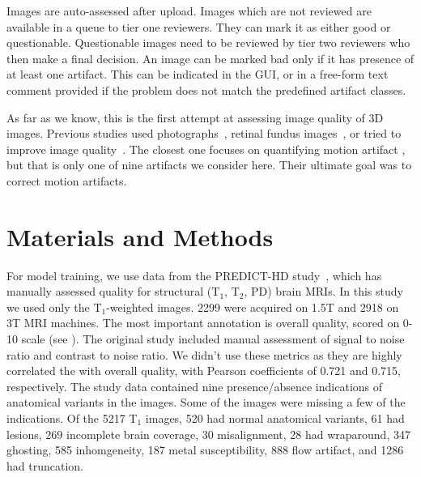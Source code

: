 \documentclass{midl} %
\begin{document}
Images are auto-assessed after upload.
Images which are not reviewed are available in a queue to tier one reviewers. They can mark it as either good or questionable. Questionable images need to be reviewed by tier two reviewers who then make a final decision. An image can be marked bad only if it has presence of at least one artifact. This can be indicated in the GUI, or in a free-form text comment provided if the problem does not match the predefined artifact classes.


As far as we know, this is the first attempt at assessing image quality of 3D images. Previous studies used photographs~\cite{bosse2017deep,hosu2020koniq}, retinal fundus images~\cite{yu2017image},
or tried to improve image quality~\cite{higaki2019improvement}. The closest one focuses on quantifying motion artifact \cite{butskova2021adversarial}, but that is only one of nine artifacts we consider here. Their ultimate goal was to correct motion artifacts. %

\section{Materials and Methods}

For model training, we use data from the PREDICT-HD study~\cite{paulsen2014clinical}, which has manually assessed quality for structural (T$_1$, T$_2$, PD) brain MRIs. In this study we used only the T$_1$-weighted images. 2299 were acquired on 1.5T and 2918 on 3T MRI machines. The most important annotation is overall quality, scored on 0-10 scale (see ). The original study included manual assessment of signal to noise ratio and contrast to noise ratio. We didn't use these metrics as they are highly correlated the with overall quality, with Pearson coefficients of 0.721 and 0.715, respectively.
The study data contained nine presence/absence indications of anatomical variants in the images. Some of the images were missing a few of the indications. Of the 5217 T$_1$ images, 520 had normal anatomical variants, 61 had lesions, 269 incomplete brain coverage, 30 misalignment, 28 had wraparound, 347 ghosting, 585 inhomgeneity, 187 metal susceptibility, 888 flow artifact, and 1286 had truncation.
\end{document}
